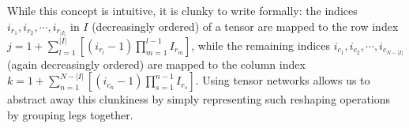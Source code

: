 While this concept is intuitive, it is clunky to write formally: the indices $i_{r_1},i_{r_2},\cdots, i_{r_{|I|}}$ in $I$ (decreasingly ordered) of a tensor are mapped to the row index $
j = 1+\sum_{l=1}^{|I|}
\left[(i_{r_l}-1)\prod_{m=1}^{l-1}I_{r_m}\right]
$, while the remaining indices $i_{c_1},i_{c_2},\cdots, i_{c_{N-|I|}}$ (again decreasingly ordered) are mapped to the column index $k  = 1+\sum_{n=1}^{N - |I|}
\left[(i_{c_n}-1)\prod_{s=1}^{n-1}I_{r_s}\right]$. Using tensor networks allows us to abstract away this clunkiness by simply representing such 
reshaping operations by grouping legs together. 

